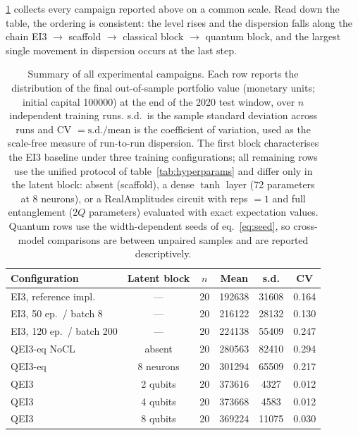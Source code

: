 \documentclass[aps,floatfix,superscriptaddress,twocolumn,tightenlines,amsmath,amssymb,nofootinbib,10pt,longbibliography,prl]{revtex4-2}
\begin{document}
\ref{tab:summary} collects every campaign reported above on a common scale.
Read down the table, the ordering is consistent: the level rises and the
dispersion falls along the chain EI3 $\to$ scaffold $\to$ classical block $\to$
quantum block, and the largest single movement in dispersion occurs at the last
step.
\begin{table}[htbp]
  \centering
  \caption{Summary of all experimental campaigns. Each row reports the
  distribution of the final out-of-sample portfolio value (monetary units;
  initial capital \num{100000}) at the end of the 2020 test window, over
  $n$ independent training runs. s.d.\ is the sample standard deviation
  across runs and CV $= \mathrm{s.d.}/\text{mean}$ is the coefficient of
  variation, used as the scale-free measure of run-to-run dispersion.
  The first block characterises the EI3 baseline under three training
  configurations; all remaining rows use the unified protocol of
  table~\ref{tab:hyperparams} and differ only in the latent block:
  absent (scaffold), a dense $\tanh$ layer (72 parameters at 8 neurons),
  or a RealAmplitudes circuit with reps $=1$ and full entanglement
  ($2Q$ parameters) evaluated with exact expectation values. Quantum
  rows use the width-dependent seeds of eq.~\eqref{eq:seed}, so
  cross-model comparisons are between unpaired samples and are reported
  descriptively.}
  \label{tab:summary}
  \begin{tabular}{lccccc}
    \toprule
    Configuration & Latent block & $n$ & Mean & s.d. & CV \\
    \midrule
    EI3, reference impl.      & ---        & 20 & \num{192638} & \num{31608} & 0.164 \\
    EI3, 50 ep.\ / batch 8    & ---        & 20 & \num{216122} & \num{28132} & 0.130 \\
    EI3, 120 ep.\ / batch 200 & ---        & 20 & \num{224138} & \num{55409} & 0.247 \\
    \midrule
    QEI3-eq NoCL              & absent     & 20 & \num{280563} & \num{82410} & 0.294 \\
    QEI3-eq                   & 8 neurons  & 20 & \num{301294} & \num{65509} & 0.217 \\
    \midrule
    QEI3                      & 2 qubits   & 20 & \num{373616} & \num{4327}  & 0.012 \\
    QEI3                      & 4 qubits   & 20 & \num{373668} & \num{4583}  & 0.012 \\
    QEI3                      & 8 qubits   & 20 & \num{369224} & \num{11075} & 0.030 \\
    \bottomrule
  \end{tabular}
\end{table}
\end{document}
